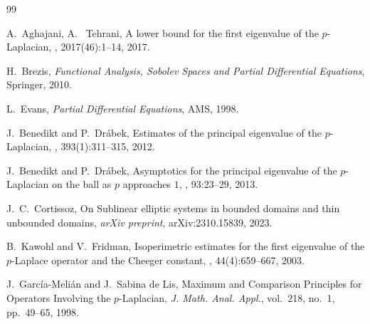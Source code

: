 \documentclass[11pt]{amsart}
\theoremstyle{definition}
\begin{document}
\begin{thebibliography}{99}

A.~Aghajani, A. ~Tehrani,
\newblock A lower bound for the first eigenvalue of the $p$-Laplacian,
, 2017(46):1--14, 2017.


H.~Brezis,
\newblock \emph{Functional Analysis, Sobolev Spaces and Partial Differential Equations},
\newblock Springer, 2010.

L.~Evans,
\newblock \emph{Partial Differential Equations},
\newblock AMS, 1998.



J.~Benedikt and P.~Drábek,
\newblock Estimates of the principal eigenvalue of the $p$-Laplacian,
, 393(1):311--315, 2012.

J.~Benedikt and P.~Drábek,
\newblock Asymptotics for the principal eigenvalue of the $p$-Laplacian on the ball as $p$ approaches $1$,
, 93:23--29, 2013.

J.~C.~Cortissoz,
\newblock On Sublinear elliptic systems in bounded domains and thin unbounded domains,
\newblock \emph{arXiv preprint}, arXiv:2310.15839, 2023.

B.~Kawohl and V.~Fridman,
\newblock Isoperimetric estimates for the first eigenvalue of the $p$-Laplace operator and the Cheeger constant,
, 44(4):659–667, 2003.

J.~García-Melián and J.~Sabina de Lis,
Maximum and Comparison Principles for Operators Involving the $p$-Laplacian,
{\em J. Math. Anal. Appl.},
vol.~218, no.~1, pp.~49--65, 1998.


\end{thebibliography}
\end{document}
